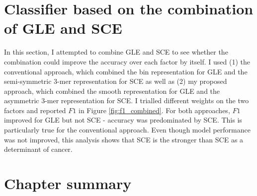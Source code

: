 

\section{Classifier based on the combination of GLE and SCE}\label{ml:both}
In this section, I attempted to combine GLE and SCE to see whether the combination could improve the accuracy over each factor by itself. I used (1) the conventional approach, which combined the bin representation for GLE and the semi-symmetric 3-mer representation for SCE as well as (2) my proposed approach, which combined the smooth representation for GLE and the asymmetric 3-mer representation for SCE. I trialled different weights on the two factors and reported $F1$ in Figure \ref{fig:f1_combined}. For both approaches, $F1$ improved for GLE but not SCE - accuracy was predominated by SCE. This is particularly true for the conventional approach. Even though model performance was not improved, this analysis shows that SCE is the stronger than SCE as a determinant of cancer.



\section{Chapter summary}